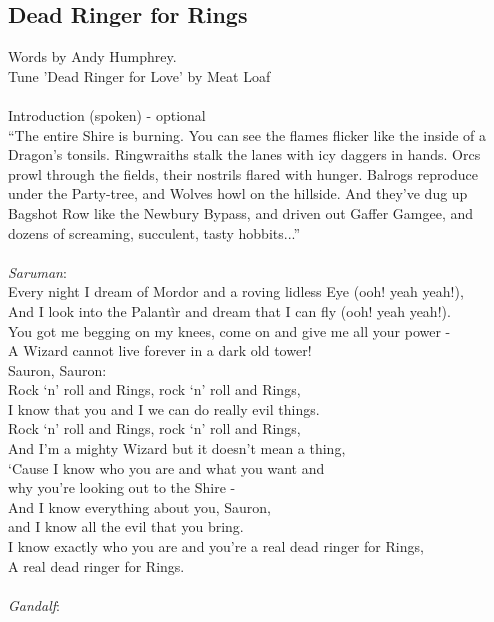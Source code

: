 \begin{multicols}{2}
\section{Dead Ringer for Rings}
Words by Andy Humphrey.
\\
Tune ’Dead Ringer for Love’ by Meat Loaf
\\
\\
Introduction (spoken) - optional
\\
“The entire Shire is burning. You can see the flames flicker like the inside of a Dragon’s tonsils. Ringwraiths stalk the lanes with icy daggers in  hands. Orcs prowl through the fields, their nostrils flared with hunger. Balrogs reproduce under the Party-tree, and Wolves howl on the hillside. And they’ve dug up Bagshot Row like the Newbury Bypass, and driven out Gaffer Gamgee, and dozens of screaming, succulent, tasty hobbits...”
\\
\\
\textit{Saruman}:
\\
Every night I dream of Mordor and a roving lidless Eye (ooh! yeah yeah!),
\\
And I look into the Palant\`ir and dream that I can fly (ooh! yeah yeah!).
\\
You got me begging on my knees, come on and give me all your power -
\\
A Wizard cannot live forever in a dark old tower!
\\
Sauron, Sauron:
\\
Rock ‘n’ roll and Rings, rock ‘n’ roll and Rings,
\\
I know that you and I we can do really evil things.
\\
Rock ‘n’ roll and Rings, rock ‘n’ roll and Rings,
\\
And I’m a mighty Wizard but it doesn’t mean a thing,
\\
‘Cause I know who you are and what you want and
\\
why you’re looking out to the Shire -
\\
And I know everything about you, Sauron, 
\\
and I know all the evil that you bring.
\\
I know exactly who you are and you’re a real dead ringer for Rings,
\\
A real dead ringer for Rings.
\\
\\
\textit{Gandalf}:
\\

\end{multicols}
